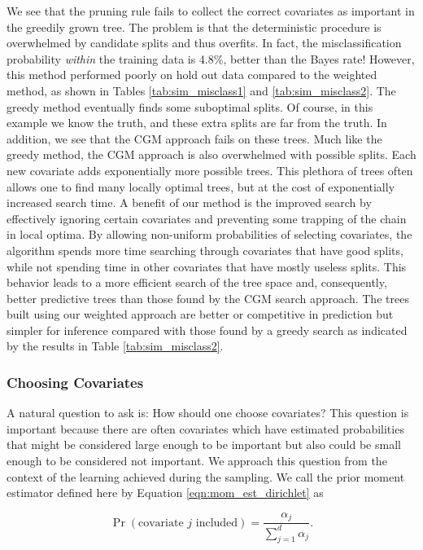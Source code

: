 We see that the pruning rule fails to collect the correct covariates as important in the greedily grown tree. The problem is that the deterministic procedure is overwhelmed by candidate splits and thus overfits. In fact, the misclassification probability \emph{within} the training data is 4.8\%, better than the Bayes rate! However, this method performed poorly on hold out data compared to the weighted method, as shown in Tables \ref{tab:sim_misclass1} and \ref{tab:sim_misclass2}. The greedy method eventually finds some suboptimal splits. Of course, in this example we know the truth, and these extra splits are far from the truth. In addition, we see that the CGM approach fails on these trees. Much like the greedy method, the CGM approach is also overwhelmed with possible splits. Each new covariate adds exponentially more possible trees. This plethora of trees often allows one to find many locally optimal trees, but at the cost of exponentially increased search time. A benefit of our method is the improved search by effectively ignoring certain covariates and preventing some trapping of the chain in local optima. By allowing non-uniform probabilities of selecting covariates, the algorithm spends more time searching through covariates that have good splits, while not spending time in other covariates that have mostly useless splits. This behavior leads to a more efficient search of the tree space and, consequently, better predictive trees than those found by the CGM search approach. The trees built using our weighted approach are better or competitive in prediction but simpler for inference compared with those found by a greedy search as indicated by the results in Table \ref{tab:sim_misclass2}. 

\subsubsection{Choosing Covariates}
A natural question to ask is: How should one choose covariates? This question is important because there are often covariates which have estimated probabilities that might be considered large enough to be important but also could be small enough to be considered   not important. We approach this question from the context of the learning achieved during the sampling. We call the prior moment estimator defined here by Equation \ref{eqn:mom_est_dirichlet} as

\begin{equation}\label{eqn:mom_est_dirichlet}
\Pr(\text{covariate $j$ included})= \frac{\alpha_j}{\sum_{j=1}^d \alpha_j}.
\end{equation}

